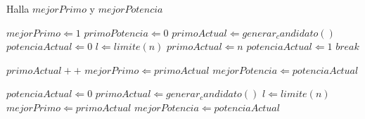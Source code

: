 \begin{algorithm}
\caption{Halla $mejorPrimo$ y $mejorPotencia$}
\begin{algorithmic}[1]
\STATE $mejorPrimo \Leftarrow 1$
\STATE $primoPotencia \Leftarrow 0$
\STATE $primoActual \Leftarrow generar_candidato()$
\STATE $potenciaActual \Leftarrow 0$
\STATE $l \Leftarrow limite(n)$
        \STATE $primoActual \Leftarrow n$
        \STATE $potenciaActual \Leftarrow 1$
        \STATE $break$
    \ENDIF

        \STATE $primoActual++$
    \ELSE
            \STATE $mejorPrimo \Leftarrow primoActual$
            \STATE $mejorPotencia \Leftarrow potenciaActual$
        \ENDIF

        \STATE $potenciaActual \Leftarrow 0$
        \STATE $primoActual \Leftarrow generar_candidato()$
        \STATE $l \Leftarrow limite(n)$
    \ENDIF
\ENDWHILE
{}
    \STATE $mejorPrimo \Leftarrow primoActual$
    \STATE $mejorPotencia \Leftarrow potenciaActual$
\ENDIF
\end{algorithmic}
\end{algorithm}
